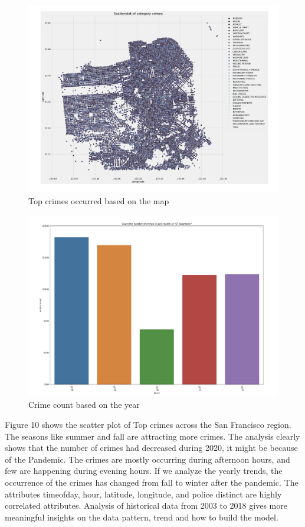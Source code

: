 \documentclass[conference,final,]{IEEEtran}
\begin{document}
\begin{figure}

{\centering \includegraphics[width=0.7\linewidth]{img/fig10} 

}

\caption{Top crimes occurred based on the map}\label{fig:unnamed-chunk-10}
\end{figure}

\begin{figure}

{\centering \includegraphics[width=0.5\linewidth]{img/fig11} 

}

\caption{Crime count based on the year}\label{fig:unnamed-chunk-11}
\end{figure}

Figure 10 shows the scatter plot of Top crimes across the San Francisco
region. The seasons like summer and fall are attracting more crimes. The
analysis clearly shows that the number of crimes had decreased during
2020, it might be because of the Pandemic. The crimes are mostly occurring
during afternoon hours, and few are happening during evening hours. If
we analyze the yearly trends, the occurrence of the crimes has changed
from fall to winter after the pandemic. The attributes timeofday, hour,
latitude, longitude, and police distinct are highly correlated
attributes. Analysis of historical data from 2003 to 2018 gives more
meaningful insights on the data pattern, trend and how to build the
model.
\end{document}
